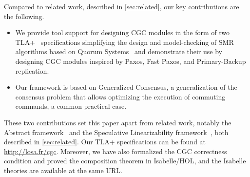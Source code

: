 Compared to related work, described in \cref{sec:related}, our key contributions are the following.
\begin{itemize}
    \item We provide tool support for designing CGC modules in the form of two TLA+~\cite{Lamport02SpecifyingSystems} specifications simplifying the design and model-checking of SMR algorithms based on Quorum Systems~\cite{GuerraouiVukolic10RefinedQuorumSystems} and demonstrate their use by designing CGC modules inspired by Paxos, Fast Paxos, and Primary-Backup replication.
    \item Our framework is based on Generalized Consensus, a generalization of the consensus problem 
        that allows optimizing the execution of commuting commands, a common practical case.
\end{itemize}
These two contributions set this paper apart from related work, notably the Abstract framework~\cite{GuerraouiETAL10Next700BftProtocols} and the Speculative Linearizability framework~\cite{GuerraouiKuncakLosa12SpeculativeLinearizability}, both described in \cref{sec:related}.
Our TLA+ specifications can be found at \url{http://losa.fr/cgc}.
Moreover, we have also formalized the CGC correctness condition and proved the composition theorem in Isabelle/HOL\@, and the Isabelle theories are available at the same URL\@.
